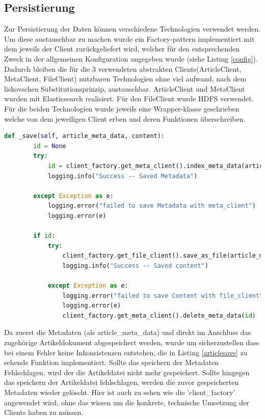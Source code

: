 \documentclass[12pt,oneside,a4paper,parskip]{scrbook}
\begin{document}
\subsection{Persistierung}
Zur Persistierung der Daten können verschiedene Technologien verwendet werden. Um diese austauschbar zu machen wurde ein Factory-pattern implementiert mit dem jeweils der Client zurückgeliefert wird, welcher für den entsprechenden Zweck in der allgemeinen Konfiguration angegeben wurde (siehe Listing \ref{config}). Dadurch bleiben die für die 3 verwendeten abstrakten Clients(ArticleClient, MetaClient, FileClient) nutzbaren Technologien ohne viel aufwand, nach dem liskovschen Substitutionsprinzip, austauschbar. ArticleClient und MetaClient  wurden mit Elasticsearch realisiert. Für den FileClient wurde HDFS verwendet. Für die beiden Technologien wurde jeweils eine Wrapper-klasse geschrieben welche von dem jeweiligen Client erben und deren Funktionen überschreiben.
\begin{lstlisting}[basicstyle=\small, caption=Funktion zum Speichern der Daten, label=articlesave,language=python]
    def _save(self, article_meta_data, content):
        id = None
        try:
            id = client_factory.get_meta_client().index_meta_data(article_meta_data)
            logging.info("Success -- Saved Metadata")

        except Exception as e:
            logging.error("failed to save Metadata with meta_client")
            logging.error(e)

        if id:
            try:
                client_factory.get_file_client().save_as_file(article_meta_data["filepath"], article_meta_data["filename"], content)
                logging.info("Success -- Saved content")

            except Exception as e:
                logging.error("failed to save Content with file_client")
                logging.error(e)
                client_factory.get_meta_client().delete_meta_data(id)

\end{lstlisting}
Da zuerst die Metadaten (als article\_meta\_data) und direkt im Anschluss das zugehörige Artikeldokument abgespeichert werden, wurde um sicherzustellen dass bei einem Fehler keine Inkonsistenzen entstehen, die in Listing \ref{articlesave} zu sehende Funktion implementiert. Sollte das speichern der Metadaten Fehlschlagen, wird der die Artikeldatei nicht mehr gespeichert. Sollte hingegen das speichern der Artikeldatei fehlschlagen, werden die zuvor gespeicherten Metadaten wieder gelöscht. Hier ist auch zu sehen wie die 'client\_factory' angewendet wird, ohne das wissen um die konkrete, technische Umsetzung der Clients haben zu müssen.
\pagebreak
\end{document}
